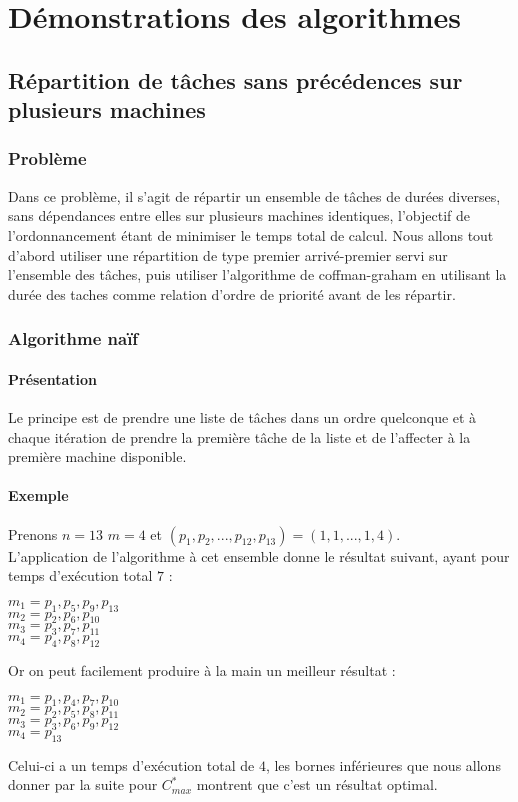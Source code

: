 \chapter{Démonstrations des algorithmes}
\section{Répartition de tâches sans précédences sur plusieurs machines}
\subsection{Problème}
Dans ce problème, il s'agit de répartir un ensemble de tâches de durées 
diverses, sans dépendances entre elles sur plusieurs machines identiques, 
l'objectif de l'ordonnancement étant de minimiser le temps total de calcul.
Nous allons tout d'abord utiliser une répartition de type premier arrivé-premier 
servi sur l'ensemble des tâches, puis utiliser l'algorithme de coffman-graham en 
utilisant la durée des taches comme relation d'ordre de priorité avant de les 
répartir.

\subsection{Algorithme naïf}
\subsubsection{Présentation}
Le principe est de prendre une liste de tâches dans un ordre quelconque et 
à chaque itération de prendre la première tâche de la liste et de l'affecter 
à la première machine disponible.
\subsubsection{Exemple}
Prenons ${n=13}$ ${m=4}$ et ${(p_{1},p_{2},...,p_{12},p_{13}) 
= (1,1,...,1,4)}$.\\
L'application de l'algorithme à cet ensemble donne le résultat suivant, ayant 
pour temps d'exécution total $7$ :
\begin{center}
$m_{1} = {p_{1},p_{5},p_{9},p_{13}}$ \\
$m_{2} = {p_{2},p_{6},p_{10}}$ \\
$m_{3} = {p_{3},p_{7},p_{11}}$ \\
$m_{4} = {p_{4},p_{8},p_{12}}$ \\
\end{center}
Or on peut facilement produire à la main un meilleur résultat :
\begin{center}
$m_{1} = {p_{1},p_{4},p_{7},p_{10}}$ \\
$m_{2} = {p_{2},p_{5},p_{8},p_{11}}$ \\
$m_{3} = {p_{3},p_{6},p_{9},p_{12}}$ \\
$m_{4} = {p_{13}}$ \\
\end{center}
Celui-ci a un temps d'exécution total de $4$, les bornes inférieures que nous 
allons donner par la suite pour $C^*_{max}$ montrent que c'est un résultat 
optimal.
